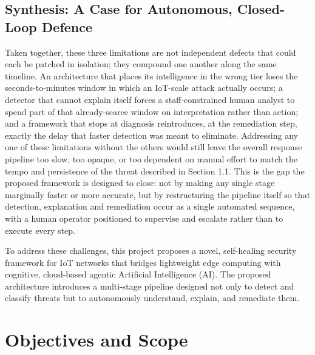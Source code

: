 \subsection{Synthesis: A Case for Autonomous, Closed-Loop Defence}

Taken together, these three limitations are not independent defects that could each be patched in isolation; they compound one another along the same timeline. An architecture that places its intelligence in the wrong tier loses the seconds-to-minutes window in which an IoT-scale attack actually occurs; a detector that cannot explain itself forces a staff-constrained human analyst to spend part of that already-scarce window on interpretation rather than action; and a framework that stops at diagnosis reintroduces, at the remediation step, exactly the delay that faster detection was meant to eliminate. Addressing any one of these limitations without the others would still leave the overall response pipeline too slow, too opaque, or too dependent on manual effort to match the tempo and persistence of the threat described in Section 1.1. This is the gap the proposed framework is designed to close: not by making any single stage marginally faster or more accurate, but by restructuring the pipeline itself so that detection, explanation and remediation occur as a single automated sequence, with a human operator positioned to supervise and escalate rather than to execute every step.

To address these challenges, this project proposes a novel, self-healing security framework for IoT networks that bridges lightweight edge computing with cognitive, cloud-based agentic Artificial Intelligence (AI). The proposed architecture introduces a multi-stage pipeline designed not only to detect and classify threats but to autonomously understand, explain, and remediate them.

\section{Objectives and Scope}

